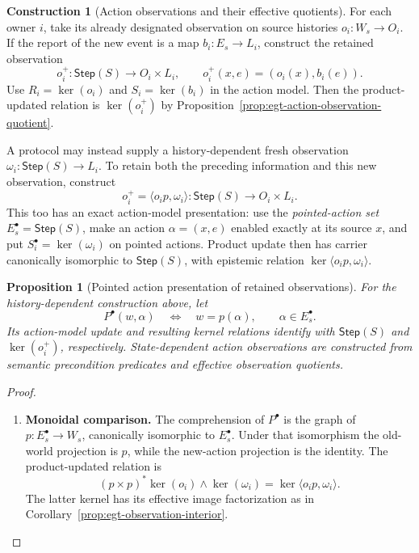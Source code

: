 \documentclass[11pt,a4paper]{article}
\numberwithin{equation}{section}
\newtheorem{proposition}[theorem]{Proposition}
\theoremstyle{definition}
\newtheorem{construction}[construction]{Construction}
\theoremstyle{remark}
\theoremstyle{plain}
\begin{document}
\begin{construction}[Action observations and their effective quotients]
\label{con:egt-operational-action-observations}
For each owner $i$, take its already designated observation on source
histories $o_i:W_s\to O_i$. If the report of the new event is a map
$b_i:E_s\to L_i$, construct the retained observation
\[
 o_i^+:\mathsf{Step}(S)\to O_i\times L_i,
 \qquad o_i^+(x,e)=(o_i(x),b_i(e)).
\]
Use $R_i=\ker(o_i)$ and $S_i=\ker(b_i)$ in the action model.
Then the product-updated relation is $\ker(o_i^+)$ by
Proposition~\ref{prop:egt-action-observation-quotient}.

A protocol may instead supply a history-dependent fresh observation
$\omega_i:\mathsf{Step}(S)\to L_i$. To retain both the preceding
information and this new observation, construct
\[
 o_i^+=\langle o_ip,\omega_i\rangle:
 \mathsf{Step}(S)\to O_i\times L_i.
\]
This too has an exact action-model presentation: use the
\emph{pointed-action set} $E_s^\bullet=\mathsf{Step}(S)$, make an action
$\alpha=(x,e)$ enabled exactly at its source $x$, and put
$S_i^\bullet=\ker(\omega_i)$ on pointed actions. Product update then has
carrier canonically isomorphic to $\mathsf{Step}(S)$, with epistemic
relation $\ker\langle o_ip,\omega_i\rangle$.
\end{construction}

\begin{proposition}[Pointed action presentation of retained observations]
\label{prop:egt-pointed-action-observations}
For the history-dependent construction above, let
\[
 P^\bullet(w,\alpha)\quad\Longleftrightarrow\quad
 w=p(\alpha),\qquad \alpha\in E_s^\bullet.
\]
Its action-model update and resulting kernel relations identify with
$\mathsf{Step}(S)$ and $\ker(o_i^+)$, respectively. State-dependent action observations are constructed from semantic precondition predicates and effective observation quotients.
\end{proposition}
\begin{proof}
\leavevmode
\begin{enumerate}[label=\textup{(\arabic*)},leftmargin=*,itemsep=4pt,topsep=3pt]
  \item \textbf{Monoidal comparison.} The comprehension of $P^\bullet$ is the graph of
$p:E_s^\bullet\to W_s$, canonically isomorphic to $E_s^\bullet$. Under that isomorphism the old-world projection is $p$, while the
new-action projection is the identity. The product-updated relation is
\[
 (p\times p)^*\ker(o_i)\wedge\ker(\omega_i)
 =\ker\langle o_ip,\omega_i\rangle.
\]
The latter kernel has its effective image factorization as in
Corollary~\ref{prop:egt-observation-interior}.
\end{enumerate}
\end{proof}
\end{document}
